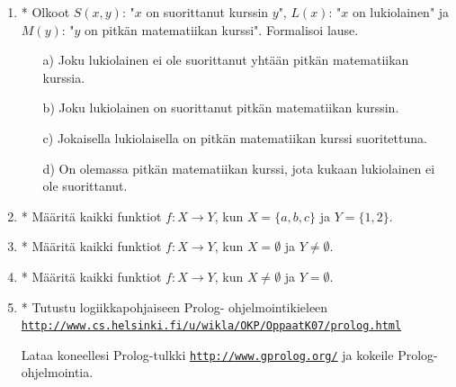 \begin{enumerate}
\item * %
Olkoot $S(x,y)$: "$x$ on suorittanut
kurssin $y$", $L(x)$: "$x$ on lukiolainen" ja $M(y)$: "$y$ on
pitkän matematiikan kurssi". Formalisoi lause.
\begin{itemize}
\item[a)] Joku lukiolainen ei ole suorittanut yhtään pitkän
matematiikan kurssia.
\item[b)] Joku lukiolainen on suorittanut pitkän matematiikan
kurssin.
\item[c)] Jokaisella lukiolaisella on pitkän matematiikan kurssi
suoritettuna.
\item[d)] On olemassa pitkän matematiikan kurssi, jota kukaan
lukiolainen ei ole suorittanut.
\end{itemize}

\item * %
Määritä kaikki funktiot $f\colon X\to Y$,
kun $X=\{a,b,c\}$ ja $Y=\{1,2\}$.

\item * %
Määritä kaikki funktiot $f\colon X\to Y$,
kun $X=\emptyset$ ja $Y\neq \emptyset$.

\item * %
Määritä kaikki funktiot $f\colon X\to Y$,
kun $X\neq \emptyset$ ja $Y= \emptyset$.

\item * %
Tutustu logiikkapohjaiseen Prolog-
ohjelmointikieleen\\
\href{http://www.cs.helsinki.fi/u/wikla/OKP/OppaatK07/prolog.html}
{{\tt http://www.cs.helsinki.fi/u/wikla/OKP/OppaatK07/prolog.html}}

Lataa koneellesi Prolog-tulkki \href{http://www.gprolog.org/}
{{\tt http://www.gprolog.org/}}
ja kokeile Prolog-ohjelmointia.

\end{enumerate}
